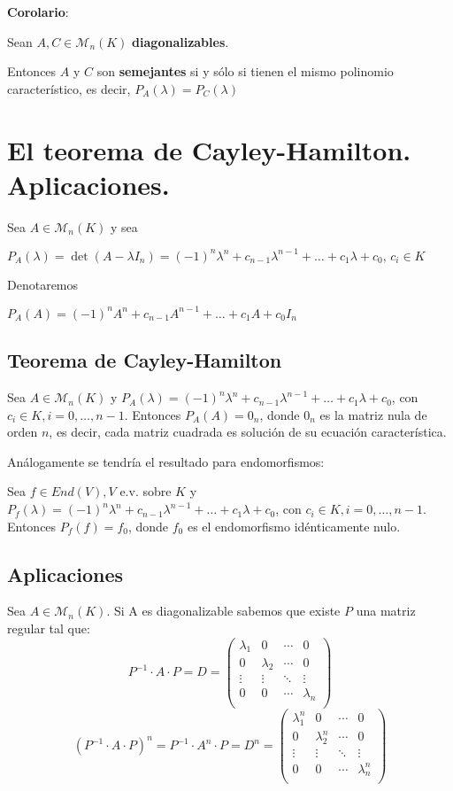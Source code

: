 \documentclass[x11names,table]{report}
\begin{document}
\textbf{Corolario}:

Sean $A,C\in \mathcal{M}_n(K)$ \textbf{diagonalizables}.

Entonces $A$ y $C$ son \textbf{semejantes} si y sólo si tienen el mismo polinomio característico, es decir, $P_A(\lambda)=P_C(\lambda)$


\section{El teorema de Cayley-Hamilton. Aplicaciones.}

Sea $A\in\mathcal{M}_n(K)$ y sea 

$P_A(\lambda)=\det(A-\lambda I_n)=(-1)^n\lambda^n+c_{n-1}\lambda^{n-1}+\dots +c_1\lambda+c_0,\, c_i\in K$

Denotaremos

$P_A(A)=(-1)^nA^n+c_{n-1}A^{n-1}+\dots +c_1A+c_0 I_n$

\subsection{Teorema de Cayley-Hamilton}

Sea $A\in\mathcal{M}_n(K)$ y $P_A(\lambda)=(-1)^n\lambda^n+c_{n-1}\lambda^{n-1}+\dots +c_1\lambda+c_0$, con $c_i\in K, i=0,\dots,n-1$. Entonces $P_A(A)=0_n$, donde $0_n$ es la matriz nula de orden $n$, es decir, cada matriz cuadrada es solución de su ecuación característica.

Análogamente se tendría el resultado para endomorfismos:

Sea $f\in End(V), V$ e.v. sobre $K$ y 
$P_f(\lambda)=(-1)^n\lambda^n+c_{n-1}\lambda^{n-1}+\dots +c_1\lambda+c_0$, con $c_i\in K, i=0,\dots,n-1$. Entonces $P_f(f)=f_0$, donde $f_0$ es el endomorfismo idénticamente nulo.

\subsection{Aplicaciones}

Sea $A\in\mathcal{M}_n(K)$. Si A es diagonalizable sabemos que existe $P$ una matriz regular tal que:
\[ P^{-1}\cdot A\cdot P=D=
\begin{pmatrix}
\lambda_1&0&\cdots&0\\
0&\lambda_2&\cdots&0\\
\vdots&\vdots&\ddots&\vdots\\
0&0&\cdots&\lambda_n\\
\end{pmatrix}\]
\[(P^{-1}\cdot A\cdot P)^n=P^{-1}\cdot A^n\cdot P=D^n=\begin{pmatrix}
\lambda_1^n&0&\cdots&0\\
0&\lambda_2^n&\cdots&0\\
\vdots&\vdots&\ddots&\vdots\\
0&0&\cdots&\lambda_n^n\\
\end{pmatrix}\]
\begin{center}
\end{center}
\end{document}
